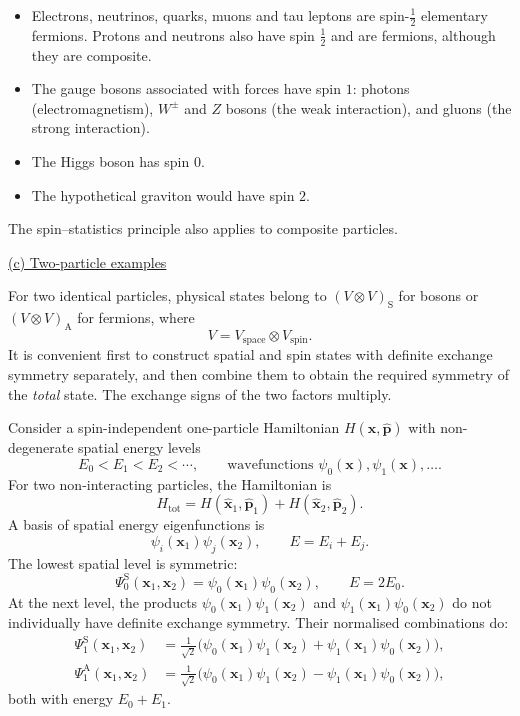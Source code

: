 \documentclass[11pt,a4paper]{article}
\begin{document}
\begin{itemize}
    \item Electrons, neutrinos, quarks, muons and tau leptons are
    spin-$\tfrac12$ elementary fermions. Protons and neutrons also have
    spin $\tfrac12$ and are fermions, although they are composite.
    \item The gauge bosons associated with forces have spin $1$:
    photons (electromagnetism), $W^\pm$ and $Z$ bosons (the weak
    interaction), and gluons (the strong interaction).
    \item The Higgs boson has spin $0$.
    \item The hypothetical graviton would have spin $2$.
\end{itemize}
The spin--statistics principle also applies to composite particles.

\medskip
\noindent
\underline{(c) Two-particle examples}

For two identical particles, physical states belong to
$(V\otimes V)_{\mathrm{S}}$ for bosons or
$(V\otimes V)_{\mathrm{A}}$ for fermions, where
\[
    V=V_{\mathrm{space}}\otimes V_{\mathrm{spin}}.
\]
It is convenient first to construct spatial and spin states with
definite exchange symmetry separately, and then combine them to obtain
the required symmetry of the \emph{total} state. The exchange signs
of the two factors multiply.

Consider a spin-independent one-particle Hamiltonian
$H(\hat{\mathbf{x}},\hat{\mathbf{p}})$ with non-degenerate spatial
energy levels
\[
    E_0<E_1<E_2<\cdots,
    \qquad\text{wavefunctions }\psi_0(\mathbf{x}),\psi_1(\mathbf{x}),\ldots.
\]
For two non-interacting particles, the Hamiltonian is
\[
    H_{\mathrm{tot}}
        =H(\hat{\mathbf{x}}_1,\hat{\mathbf{p}}_1)
         +H(\hat{\mathbf{x}}_2,\hat{\mathbf{p}}_2).
\]
A basis of spatial energy eigenfunctions is
\[
    \psi_i(\mathbf{x}_1)\psi_j(\mathbf{x}_2),
    \qquad E=E_i+E_j.
\]
The lowest spatial level is symmetric:
\[
    \Psi_0^{\mathrm{S}}(\mathbf{x}_1,\mathbf{x}_2)
        =\psi_0(\mathbf{x}_1)\psi_0(\mathbf{x}_2),
    \qquad E=2E_0.
\]
At the next level, the products
$\psi_0(\mathbf{x}_1)\psi_1(\mathbf{x}_2)$ and
$\psi_1(\mathbf{x}_1)\psi_0(\mathbf{x}_2)$ do not individually have
definite exchange symmetry. Their normalised combinations do:
\begin{align*}
    \Psi_1^{\mathrm{S}}(\mathbf{x}_1,\mathbf{x}_2)
        &=\frac{1}{\sqrt{2}}\bigl(
          \psi_0(\mathbf{x}_1)\psi_1(\mathbf{x}_2)
          +\psi_1(\mathbf{x}_1)\psi_0(\mathbf{x}_2)\bigr),\\
    \Psi_1^{\mathrm{A}}(\mathbf{x}_1,\mathbf{x}_2)
        &=\frac{1}{\sqrt{2}}\bigl(
          \psi_0(\mathbf{x}_1)\psi_1(\mathbf{x}_2)
          -\psi_1(\mathbf{x}_1)\psi_0(\mathbf{x}_2)\bigr),
\end{align*}
both with energy $E_0+E_1$.
\end{document}
